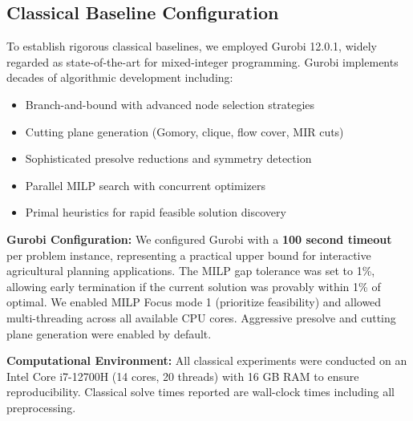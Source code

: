 \documentclass{oqireport}
\begin{document}
\subsection{Classical Baseline Configuration}

To establish rigorous classical baselines, we employed Gurobi 12.0.1, widely regarded as state-of-the-art for mixed-integer programming. Gurobi implements decades of algorithmic development including:

\begin{itemize}
    \item Branch-and-bound with advanced node selection strategies
    \item Cutting plane generation (Gomory, clique, flow cover, MIR cuts)
    \item Sophisticated presolve reductions and symmetry detection
    \item Parallel MILP search with concurrent optimizers
    \item Primal heuristics for rapid feasible solution discovery
\end{itemize}

\textbf{Gurobi Configuration:} We configured Gurobi with a \textbf{100 second timeout} per problem instance, representing a practical upper bound for interactive agricultural planning applications. The MILP gap tolerance was set to 1\%, allowing early termination if the current solution was provably within 1\% of optimal. We enabled MILP Focus mode 1 (prioritize feasibility) and allowed multi-threading across all available CPU cores. Aggressive presolve and cutting plane generation were enabled by default.

\textbf{Computational Environment:} All classical experiments were conducted on an Intel Core i7-12700H (14 cores, 20 threads) with 16 GB RAM to ensure reproducibility. Classical solve times reported are wall-clock times including all preprocessing. 








\end{document}
